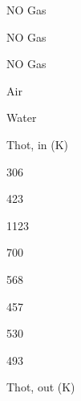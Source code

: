 \documentclass[a4paper,portrait,12pt]{article}
\begin{document}
\begin{flushleft}
NO Gas
\end{flushleft}





\begin{flushleft}
NO Gas
\end{flushleft}





\begin{flushleft}
NO Gas
\end{flushleft}





\begin{flushleft}
Air
\end{flushleft}





\begin{flushleft}
Water
\end{flushleft}


\begin{flushleft}
Thot, in (K)
\end{flushleft}





306





423





1123





700





568





457





530





493





\begin{flushleft}
Thot, out (K)
\end{flushleft}
\end{document}
